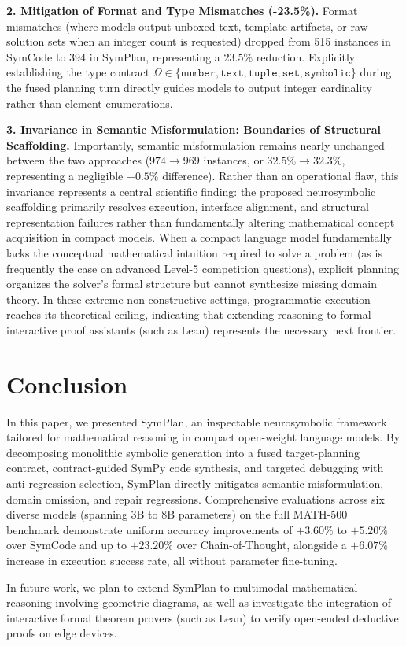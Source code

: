 \documentclass[conference,a4paper]{IEEEtran}
\begin{document}
\textbf{2. Mitigation of Format and Type Mismatches (-23.5\%).} Format mismatches (where models output unboxed text, template artifacts, or raw solution sets when an integer count is requested) dropped from 515 instances in SymCode to 394 in SymPlan, representing a $23.5\%$ reduction. Explicitly establishing the type contract $\Omega \in \{\texttt{number}, \texttt{text}, \texttt{tuple}, \texttt{set}, \texttt{symbolic}\}$ during the fused planning turn directly guides models to output integer cardinality rather than element enumerations.

\textbf{3. Invariance in Semantic Misformulation: Boundaries of Structural Scaffolding.} Importantly, semantic misformulation remains nearly unchanged between the two approaches ($974 \to 969$ instances, or $32.5\% \to 32.3\%$, representing a negligible $-0.5\%$ difference). Rather than an operational flaw, this invariance represents a central scientific finding: the proposed neurosymbolic scaffolding primarily resolves execution, interface alignment, and structural representation failures rather than fundamentally altering mathematical concept acquisition in compact models. When a compact language model fundamentally lacks the conceptual mathematical intuition required to solve a problem (as is frequently the case on advanced Level-5 competition questions), explicit planning organizes the solver's formal structure but cannot synthesize missing domain theory. In these extreme non-constructive settings, programmatic execution reaches its theoretical ceiling, indicating that extending reasoning to formal interactive proof assistants (such as Lean) represents the necessary next frontier.
\FloatBarrier

\section{Conclusion}

In this paper, we presented SymPlan, an inspectable neurosymbolic framework tailored for mathematical reasoning in compact open-weight language models. By decomposing monolithic symbolic generation into a fused target-planning contract, contract-guided SymPy code synthesis, and targeted debugging with anti-regression selection, SymPlan directly mitigates semantic misformulation, domain omission, and repair regressions. Comprehensive evaluations across six diverse models (spanning 3B to 8B parameters) on the full MATH-500 benchmark demonstrate uniform accuracy improvements of $+3.60\%$ to $+5.20\%$ over SymCode and up to $+23.20\%$ over Chain-of-Thought, alongside a $+6.07\%$ increase in execution success rate, all without parameter fine-tuning.

In future work, we plan to extend SymPlan to multimodal mathematical reasoning involving geometric diagrams, as well as investigate the integration of interactive formal theorem provers (such as Lean) to verify open-ended deductive proofs on edge devices.

\balance


\end{document}
